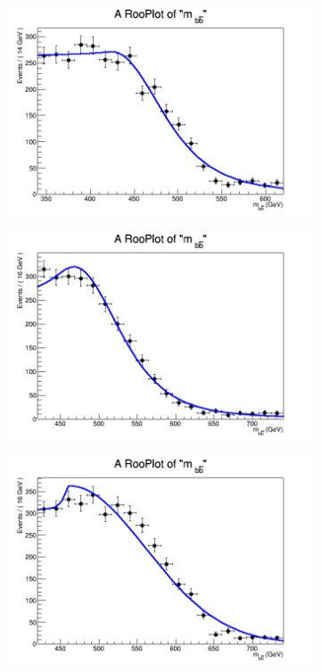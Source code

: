 \begin{figure}[phtb!]
\begin{center}
  \begin{subfigure}[$m_{A}=500$ GeV]{0.4\textwidth}\includegraphics[width=\textwidth]{FitResults/images/fitMC_bAbb500_3.png}\end{subfigure}
  \begin{subfigure}[$m_{A}=550$ GeV]{0.4\textwidth}\includegraphics[width=\textwidth]{FitResults/images/fitMC_bAbb550_3.png}\end{subfigure}
  \begin{subfigure}[$m_{A}=600$ GeV]{0.4\textwidth}\includegraphics[width=\textwidth]{FitResults/images/fitMC_bAbb600_3.png}\end{subfigure}

\end{center}
\end{figure}
